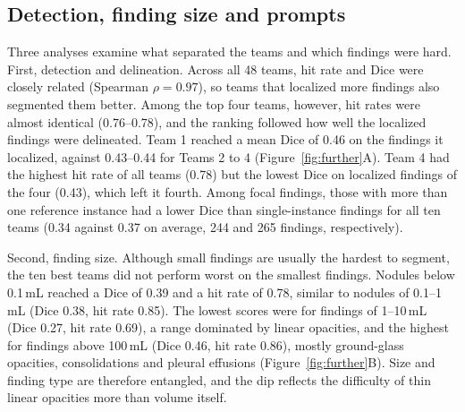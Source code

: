 \documentclass[final,5p,times,twocolumn,authoryear,numafflabel]{elsarticle}
\begin{document}
\subsection{Detection, finding size and prompts}
\label{sec:further}
Three analyses examine what separated the teams and which findings
were hard. First, detection and delineation. Across all 48 teams, hit
rate and Dice were closely related (Spearman $\rho = 0.97$), so teams
that localized more findings also segmented them better. Among the top four
teams, however, hit rates were almost identical (0.76--0.78), and the ranking
followed how well the localized findings were delineated. Team 1 reached a mean
Dice of 0.46 on the findings it localized, against 0.43--0.44 for Teams 2 to 4
(Figure~\ref{fig:further}A). Team 4 had the highest hit rate of all teams
(0.78) but the lowest Dice on localized findings of the four (0.43), which left
it fourth. Among focal findings, those with more than one reference instance had a
lower Dice than single-instance findings for all ten teams (0.34 against 0.37 on
average, 244 and 265 findings, respectively).

Second, finding size. Although small findings are usually the hardest to
segment, the ten best teams did not perform worst on the smallest findings. Nodules below 0.1\,mL reached a Dice of
0.39 and a hit rate of 0.78, similar to nodules of
0.1--1\,mL (Dice 0.38, hit rate 0.85). The lowest scores were for findings
of 1--10\,mL (Dice 0.27, hit rate 0.69), a range dominated
by linear opacities, and the highest for findings above 100\,mL
(Dice 0.46, hit rate 0.86), mostly ground-glass opacities, consolidations and
pleural effusions (Figure~\ref{fig:further}B). Size and finding type are
therefore entangled, and the dip reflects the difficulty of thin linear
opacities more than volume itself.
\end{document}
